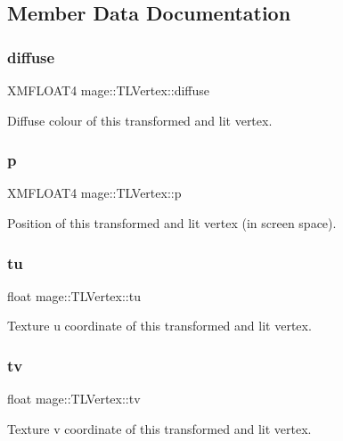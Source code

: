 \subsection{Member Data Documentation}
\hypertarget{structmage_1_1_t_l_vertex_a78d60c6622bc1091f2c1c30da0715236}{}\label{structmage_1_1_t_l_vertex_a78d60c6622bc1091f2c1c30da0715236} 
\subsubsection{\texorpdfstring{diffuse}{diffuse}}
{\footnotesize\ttfamily X\+M\+F\+L\+O\+A\+T4 mage\+::\+T\+L\+Vertex\+::diffuse}

Diffuse colour of this transformed and lit vertex. \hypertarget{structmage_1_1_t_l_vertex_a5ac68e9f9767dae9455134891712baf1}{}\label{structmage_1_1_t_l_vertex_a5ac68e9f9767dae9455134891712baf1} 
\subsubsection{\texorpdfstring{p}{p}}
{\footnotesize\ttfamily X\+M\+F\+L\+O\+A\+T4 mage\+::\+T\+L\+Vertex\+::p}

Position of this transformed and lit vertex (in screen space). \hypertarget{structmage_1_1_t_l_vertex_a33bec24f83d1daf690caf2ca2ead933b}{}\label{structmage_1_1_t_l_vertex_a33bec24f83d1daf690caf2ca2ead933b} 
\subsubsection{\texorpdfstring{tu}{tu}}
{\footnotesize\ttfamily float mage\+::\+T\+L\+Vertex\+::tu}

Texture u coordinate of this transformed and lit vertex. \hypertarget{structmage_1_1_t_l_vertex_aa82b030c0de9e7fe2403b6f540b2149b}{}\label{structmage_1_1_t_l_vertex_aa82b030c0de9e7fe2403b6f540b2149b} 
\subsubsection{\texorpdfstring{tv}{tv}}
{\footnotesize\ttfamily float mage\+::\+T\+L\+Vertex\+::tv}

Texture v coordinate of this transformed and lit vertex. 
